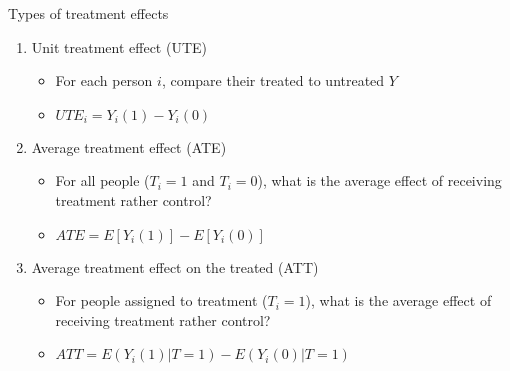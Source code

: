 \begin{frame}{Types of treatment effects}{}

	\begin{enumerate}
		\item Unit treatment effect (UTE)
		\begin{itemize}
			\item For each person $i$, compare their treated to untreated $Y$
			\item $UTE_i=Y_i(1)-Y_i(0)$
		\end{itemize}			
		
		\item Average treatment effect (ATE)
		\begin{itemize}
			\item For all people ($T_i=1$ and $T_i=0$), what is the average effect of receiving treatment rather control?
			\item $ATE=E[Y_i(1)] - E[Y_i(0)] $
		\end{itemize}
		\item Average treatment effect on the treated (ATT)
		\begin{itemize}
			\item For people assigned to treatment ($T_i=1$), what is the average effect of receiving treatment rather control?
			\item $ ATT=E(Y_i(1)|T=1)-E(Y_i(0)|T=1) $
		\end{itemize}
	\end{enumerate}	
\end{frame}

